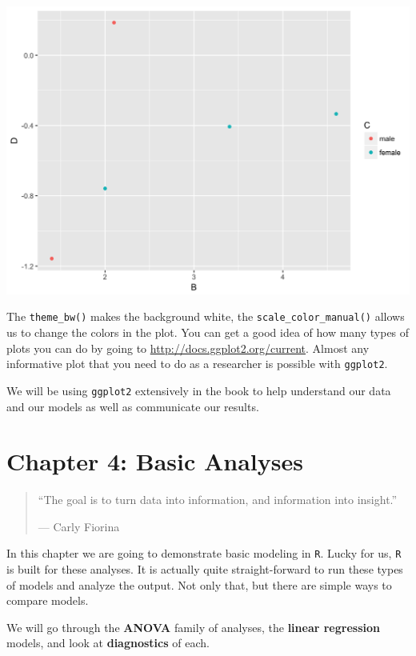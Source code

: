\documentclass[]{tufte-book}
\theoremstyle{definition}
\theoremstyle{definition}
\theoremstyle{remark}
\begin{document}
\includegraphics{_main_files/figure-latex/unnamed-chunk-60-1}

The \texttt{theme\_bw()} makes the background white, the
\texttt{scale\_color\_manual()} allows us to change the colors in the
plot. You can get a good idea of how many types of plots you can do by
going to
\href{http://docs.ggplot2.org/current/}{http://docs.ggplot2.org/current}.
Almost any informative plot that you need to do as a researcher is
possible with \texttt{ggplot2}.

We will be using \texttt{ggplot2} extensively in the book to help
understand our data and our models as well as communicate our results.

\chapter*{Chapter 4: Basic Analyses}\label{chapter-4-basic-analyses}

\begin{quote}
``The goal is to turn data into information, and information into
insight.''

--- Carly Fiorina
\end{quote}

In this chapter we are going to demonstrate basic modeling in
\texttt{R}. Lucky for us, \texttt{R} is built for these analyses. It is
actually quite straight-forward to run these types of models and analyze
the output. Not only that, but there are simple ways to compare models.

We will go through the \textbf{ANOVA} family of analyses, the
\textbf{linear regression} models, and look at \textbf{diagnostics} of
each.
\end{document}
